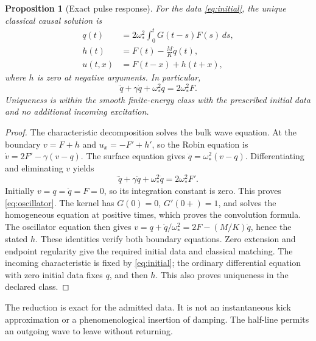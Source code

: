 \documentclass[11pt,a4paper]{article}
\newtheorem{proposition}{Proposition}[section]
\theoremstyle{remark}
\begin{document}
\begin{proposition}[Exact pulse response]
\label{prop:response}
For the data \eqref{eq:initial}, the unique classical causal solution is
\begin{align}
 q(t)&=2\omega_*^2\int_0^tG(t-s)F(s)\,ds,\\
 h(t)&=F(t)-\frac MK\dot q(t),\\
 u(t,x)&=F(t-x)+h(t+x),
 \label{eq:solution}
\end{align}
where $h$ is zero at negative arguments. In particular,
\begin{equation}
 \ddot q+\gamma\dot q+\omega_*^2q=2\omega_*^2 F.
 \label{eq:oscillator}
\end{equation}
Uniqueness is within the smooth finite-energy class with the prescribed
initial data and no additional incoming excitation.
\end{proposition}
\begin{proof}
The characteristic decomposition solves the bulk wave equation. At the
boundary $v=F+h$ and $u_x=-F'+h'$, so the Robin equation is
$\dot v=2F'-\gamma(v-q)$. The surface equation gives
$\ddot q=\omega_*^2(v-q)$. Differentiating and eliminating $v$ yields
\[
 \dddot q+\gamma\ddot q+\omega_*^2\dot q=2\omega_*^2F'.
\]
Initially $v=q=\ddot q=F=0$, so its integration constant is zero.
This proves \eqref{eq:oscillator}. The kernel has $G(0)=0$, $G'(0+)=1$,
and solves the homogeneous equation at positive times, which proves
the convolution formula. The oscillator equation then gives
$v=q+\ddot q/\omega_*^2=2F-(M/K)\dot q$, hence the stated $h$.
These identities verify both boundary equations. Zero extension and
endpoint regularity give the required initial data and classical matching.
The incoming characteristic is fixed by \eqref{eq:initial}; the ordinary
differential equation with zero initial data fixes $q$, and then $h$.
This also proves uniqueness in the declared class.
\end{proof}

The reduction is exact for the admitted data. It is not an instantaneous
kick approximation or a phenomenological insertion of damping. The
half-line permits an outgoing wave to leave without returning.
\end{document}
